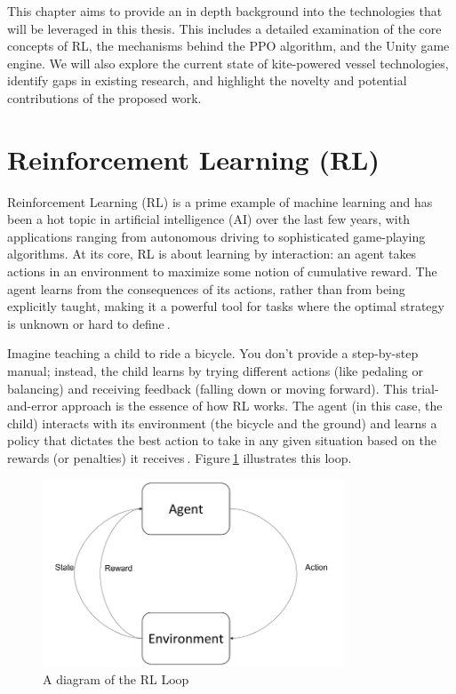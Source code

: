 This chapter aims to provide an in depth background into the technologies that will be leveraged in this thesis. This includes a detailed examination of the core concepts of RL, the mechanisms behind the PPO algorithm, and the Unity game engine. We will also explore the current state of kite-powered vessel technologies, identify gaps in existing research, and highlight the novelty and potential contributions of the proposed work.

\section{Reinforcement Learning (RL)}\label{RL_background}

Reinforcement Learning (RL) is a prime example of machine learning and has been a hot topic in artificial intelligence (AI) over the last few years, with applications ranging from autonomous driving to sophisticated game-playing algorithms. At its core, RL is about learning by interaction: an agent takes actions in an environment to maximize some notion of cumulative reward. The agent learns from the consequences of its actions, rather than from being explicitly taught, making it a powerful tool for tasks where the optimal strategy is unknown or hard to define$~$\cite{sutton2018reinforcement}.

Imagine teaching a child to ride a bicycle. You don't provide a step-by-step manual; instead, the child learns by trying different actions (like pedaling or balancing) and receiving feedback (falling down or moving forward). This trial-and-error approach is the essence of how RL works. The agent (in this case, the child) interacts with its environment (the bicycle and the ground) and learns a policy that dictates the best action to take in any given situation based on the rewards (or penalties) it receives$~$\cite{watkins1992qlearning}. Figure$~$\ref{fig:rl_diagram} illustrates this loop.

\begin{figure}
    \centering
    \includegraphics[width=0.8\textwidth]{Images/RL_Loop.png}
    \caption{A diagram of the RL Loop}\label{fig:rl_diagram}
\end{figure}

